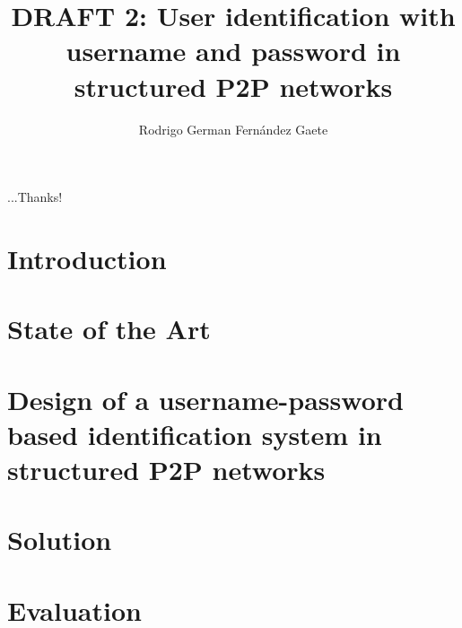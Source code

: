 \documentclass[letter, 12pt]{report}
\title{DRAFT 2: User identification with username and password in structured P2P networks}
\author{Rodrigo German Fernández Gaete}
\begin{document}


\beforepreface



...Thanks!

%


\newpage

\afterpreface


\renewcommand{\chaptername}{Chapter}
\setcounter{secnumdepth}{3}
\setcounter{tocdepth}{3}

\chapter{Introduction}
\label{sec:intro}



\chapter{State of the Art}
\label{sec:soa_p2p}


\label{sec:soa_p2p_user_identification}


\label{sec:soa_p2p_trust}


\chapter{Design of a username-password based identification system in structured P2P networks}
\label{sec:formalization}

\chapter{Solution}
\label{sec:system}


\chapter{Evaluation}
\label{sec:evaluation}

\end{document}
